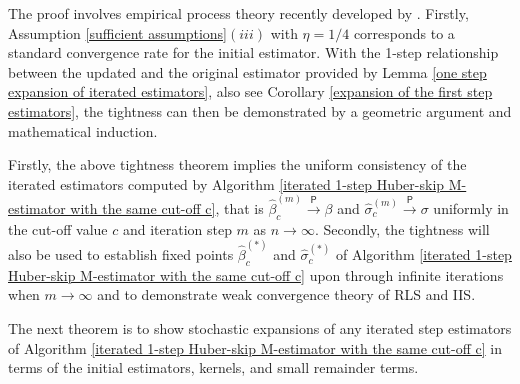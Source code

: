 \documentclass[11pt, letterpaper]{article}
\numberwithin{algorithm}{section}
\numberwithin{assumption}{section}
\numberwithin{lemma}{section}
\numberwithin{theorem}{section}
\numberwithin{corollary}{section}
\numberwithin{remark}{section}
\numberwithin{equation}{section}
\numberwithin{figure}{section}
\numberwithin{table}{section}
\begin{document}
The proof involves empirical process theory recently developed by \cite{berenguer2019analysis}. Firstly, Assumption \ref{sufficient assumptions}$(iii)$ with $\eta = 1/4$ corresponds to a standard convergence rate for the initial estimator. With the 1-step relationship between the updated and the original estimator provided by Lemma \ref{one step expansion of iterated estimators}, also see Corollary \ref{expansion of the first step estimators}, the tightness can then be demonstrated by a geometric argument and mathematical induction.

Firstly, the above tightness theorem implies the uniform consistency of the iterated estimators computed by Algorithm \ref{iterated 1-step Huber-skip M-estimator with the same cut-off c}, that is $\widehat{\beta}_{c}^{(m)} \overset{\mathsf{P}}{\to} \beta$ and $\widehat{\sigma}_{c}^{(m)} \overset{\mathsf{P}}{\to} \sigma$ uniformly in the cut-off value $c$ and iteration step $m$ as $n \to \infty$. Secondly, the tightness will also be used to establish fixed points $\widehat{\beta}_{c}^{(\ast)}$ and $\widehat{\sigma}_{c}^{(\ast)}$ of Algorithm \ref{iterated 1-step Huber-skip M-estimator with the same cut-off c} upon through infinite iterations when $m \to \infty$ and to demonstrate weak convergence theory of RLS and IIS.

The next theorem is to show stochastic expansions of any iterated step estimators of Algorithm \ref{iterated 1-step Huber-skip M-estimator with the same cut-off c} in terms of the initial estimators, kernels, and small remainder terms.
\end{document}
